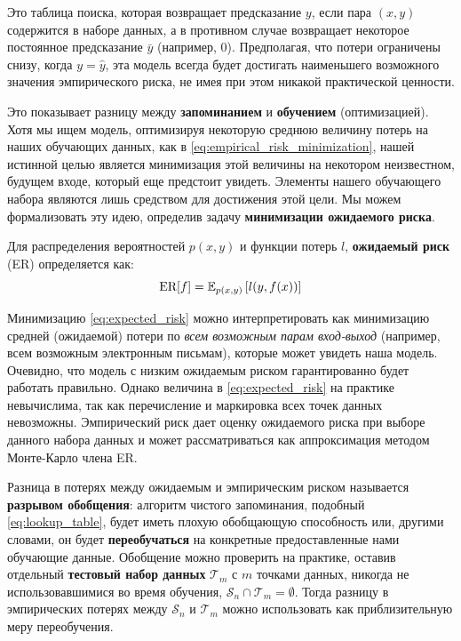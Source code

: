 \vspace{1em}
Это таблица поиска, которая возвращает предсказание $y$, если пара $(x,y)$ содержится в наборе данных, а в противном случае возвращает некоторое постоянное предсказание $\bar{y}$ (например, 0). Предполагая, что потери ограничены снизу, когда $y = \hat{y}$, эта модель всегда будет достигать наименьшего возможного значения эмпирического риска, не имея при этом никакой практической ценности. 

Это показывает разницу между \textbf{запоминанием} и \textbf{обучением} (оптимизацией). Хотя мы ищем модель, оптимизируя некоторую среднюю величину потерь на наших обучающих данных, как в \eqref{eq:empirical_risk_minimization}, нашей истинной целью является минимизация этой величины на некотором неизвестном, будущем входе, который еще предстоит увидеть. Элементы нашего обучающего набора являются лишь средством для достижения этой цели. Мы можем формализовать эту идею, определив задачу \textbf{минимизации ожидаемого риска}.

\begin{definition}
Для распределения вероятностей $p(x,y)$ и функции потерь $l$, \textbf{ожидаемый риск} (ER) определяется как:
%
\begin{equation}
\textnormal{ER}[f] = \mathbb{E}_{p(x,y)}\left[ l(y, f(x)) \right]
\label{eq:expected_risk}
\end{equation}
\end{definition}

Минимизацию \eqref{eq:expected_risk} можно интерпретировать как минимизацию средней (ожидаемой) потери по \textit{всем возможным парам вход-выход} (например, всем возможным электронным письмам), которые может увидеть наша модель. Очевидно, что модель с низким ожидаемым риском гарантированно будет работать правильно. Однако величина в \eqref{eq:expected_risk} на практике невычислима, так как перечисление и маркировка всех точек данных невозможны. Эмпирический риск дает оценку ожидаемого риска при выборе данного набора данных и может рассматриваться как аппроксимация методом Монте-Карло члена ER.

Разница в потерях между ожидаемым и эмпирическим риском называется \textbf{разрывом обобщения}: алгоритм чистого запоминания, подобный \eqref{eq:lookup_table}, будет иметь плохую обобщающую способность или, другими словами, он будет \textbf{переобучаться} на конкретные предоставленные нами обучающие данные. Обобщение можно проверить на практике, оставив отдельный \textbf{тестовый набор данных} $\mathcal{T}_m$ с $m$ точками данных, никогда не использовавшимися во время обучения, $\mathcal{S}_n \cap \mathcal{T}_m = \emptyset$. Тогда разницу в эмпирических потерях между $\mathcal{S}_n$ и $\mathcal{T}_m$ можно использовать как приблизительную меру переобучения.

